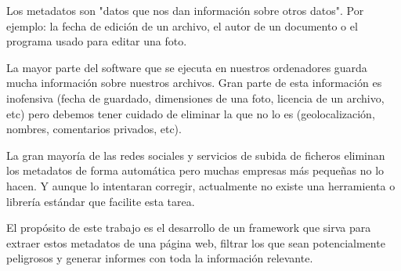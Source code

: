 Los metadatos son "datos que nos dan información sobre otros datos". Por ejemplo: la fecha de edición de un archivo, el autor de un documento o el programa usado para editar una foto.

La mayor parte del software que se ejecuta en nuestros ordenadores guarda mucha información sobre nuestros archivos. Gran parte de esta información es inofensiva (fecha de guardado, dimensiones de una foto, licencia de un archivo, etc) pero debemos tener cuidado de eliminar la que no lo es (geolocalización, nombres, comentarios privados, etc).

La gran mayoría de las redes sociales y servicios de subida de ficheros eliminan los metadatos de forma automática pero muchas empresas más pequeñas no lo hacen. Y aunque lo intentaran corregir, actualmente no existe una herramienta o librería estándar que facilite esta tarea.

El propósito de este trabajo es el desarrollo de un framework que sirva para extraer estos metadatos de una página web, filtrar los que sean potencialmente peligrosos y generar informes con toda la información relevante. 

